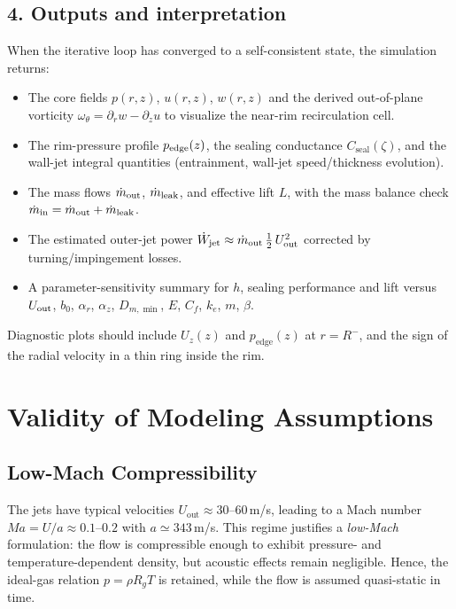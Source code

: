 \documentclass[11pt,a4paper]{article}
\begin{document}
\subsection*{4. Outputs and interpretation}
When the iterative loop has converged to a self-consistent state, the simulation returns:
\begin{itemize}
  \item The core fields \(p(r,z)\), \(u(r,z)\), \(w(r,z)\) and the derived out-of-plane vorticity \(\omega_\theta=\partial_r w-\partial_z u\) to visualize the near-rim recirculation cell.
  \item The rim-pressure profile \(p_{\rm edge}(z)\), the sealing conductance \(C_{\mathrm{seal}}(\zeta)\), and the wall-jet integral quantities (entrainment, wall-jet speed/thickness evolution).
  \item The mass flows \(\dot m_{\rm out}\), \(\dot m_{\rm leak}\), and effective lift \(L\), with the mass balance check \(\dot m_{\rm in}=\dot m_{\rm out}+\dot m_{\rm leak}\).
  \item The estimated outer-jet power \(\dot W_{\rm jet}\approx \dot m_{\rm out}\,\tfrac12\,U_{\rm out}^2\) corrected by turning/impingement losses.
  \item A parameter-sensitivity summary for \(h\), sealing performance and lift versus \(U_{\rm out}\), \(b_0\), \(\alpha_r\), \(\alpha_z\), \(D_{m,\min}\), \(E\), \(C_f\), \(k_e\), \(m\), \(\beta\).
\end{itemize}
Diagnostic plots should include \(U_z(z)\) and \(p_{\mathrm{edge}}(z)\) at \(r=R^{-}\), and the sign of the radial velocity in a thin ring inside the rim.
\section{Validity of Modeling Assumptions}
\label{sec:validity-of-modeling-assumptions}

\subsection{Low-Mach Compressibility}
The jets have typical velocities $U_{\mathrm{out}}\approx30$--$60\,$m/s, leading to a Mach number $Ma=U/a\approx0.1$--$0.2$ with $a\simeq343\,$m/s.
This regime justifies a \emph{low-Mach} formulation: the flow is compressible enough to exhibit pressure- and temperature-dependent density, but acoustic effects remain negligible.
Hence, the ideal-gas relation $p=\rho R_g T$ is retained, while the flow is assumed quasi-static in time.
\end{document}
